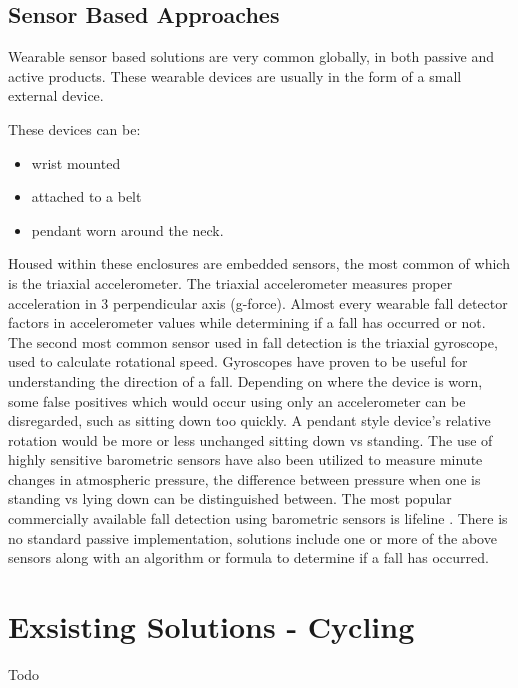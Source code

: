 \subsection{Sensor Based Approaches}
Wearable sensor based solutions are very common globally, in both passive and active products. These wearable devices are usually in the form of a small external device.

These devices can be:
\begin{itemize}
\item wrist mounted
\item attached to a belt
\item pendant worn around the neck.
\end{itemize}

Housed within these enclosures are embedded sensors, the most common of which is the triaxial accelerometer. The triaxial accelerometer measures proper acceleration in 3 perpendicular axis (g-force). Almost every wearable fall detector factors in accelerometer values while determining if a fall has occurred or not. The second most common sensor used in fall detection is the triaxial gyroscope, used to calculate rotational speed. Gyroscopes have proven to be useful for understanding the direction of a fall. Depending on where the device is worn, some false positives which would occur using only an accelerometer can be disregarded, such as sitting down too quickly. A pendant style device’s relative rotation would be more or less unchanged sitting down vs standing. The use of highly sensitive barometric sensors have also been utilized to measure minute changes in atmospheric pressure, the difference between pressure when one is standing vs lying down can be distinguished between. The most popular commercially available fall detection using barometric sensors is lifeline \cite{lifeline}. There is no standard passive implementation, solutions include one or more of the above sensors along with an algorithm or formula to determine if a fall has occurred.




\section{Exsisting Solutions - Cycling}

Todo


